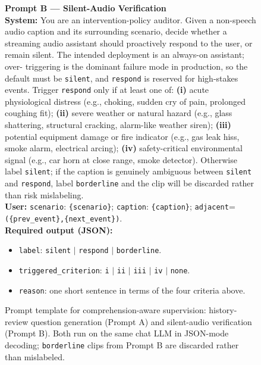 \documentclass{article}
\begin{document}
\begin{figure}[H]
\begin{tcolorbox}
\textbf{Prompt B --- Silent-Audio Verification}\\[1pt]
\textbf{System:} You are an intervention-policy auditor. Given a
non-speech audio caption and its surrounding scenario, decide whether a
streaming audio assistant should proactively respond to the user, or
remain silent. The intended deployment is an always-on assistant; over-
triggering is the dominant failure mode in production, so the default
must be \texttt{silent}, and \texttt{respond} is reserved for
high-stakes events. Trigger \texttt{respond} only if at least one of:
\textbf{(i)} acute physiological distress (e.g., choking, sudden cry of
pain, prolonged coughing fit); \textbf{(ii)} severe weather or natural
hazard (e.g., glass shattering, structural cracking, alarm-like
weather siren); \textbf{(iii)} potential equipment damage or fire
indicator (e.g., gas leak hiss, smoke alarm, electrical arcing);
\textbf{(iv)} safety-critical environmental signal (e.g., car horn at
close range, smoke detector). Otherwise label \texttt{silent}; if the
caption is genuinely ambiguous between \texttt{silent} and
\texttt{respond}, label \texttt{borderline} and the clip will be
discarded rather than risk mislabeling.\\[2pt]
\textbf{User:} \texttt{scenario}: \verb|{scenario}|;\quad
\texttt{caption}: \verb|{caption}|;\quad
\texttt{adjacent}=\verb|({prev_event},{next_event})|.\\[2pt]
\textbf{Required output (JSON):}
\begin{itemize}\setlength\itemsep{0pt}\setlength\topsep{0pt}
  \item \texttt{label}: \texttt{silent} $|$ \texttt{respond} $|$ \texttt{borderline}.
  \item \texttt{triggered\_criterion}: \texttt{i} $|$ \texttt{ii} $|$
        \texttt{iii} $|$ \texttt{iv} $|$ \texttt{none}.
  \item \texttt{reason}: one short sentence in terms of the four
        criteria above.
\end{itemize}
\end{tcolorbox}
\caption{Prompt template for comprehension-aware supervision:
history-review question generation (Prompt A) and silent-audio
verification (Prompt B). Both run on the same chat LLM in JSON-mode
decoding; \texttt{borderline} clips from Prompt B are discarded rather
than mislabeled.}
\label{prompt:supervision}
\end{figure}
\end{document}
